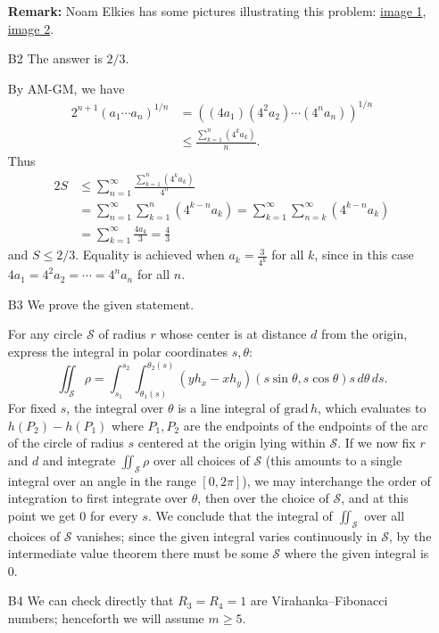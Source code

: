 \documentclass[amssymb,twocolumn,pra,10pt,aps]{revtex4-1}
\begin{document}
\begin{itemize}
\noindent
\textbf{Remark:} Noam Elkies has some pictures illustrating this problem:
\href{https://abel.math.harvard.edu/~elkies/putnam_b1a.pdf}{image 1},
\href{https://abel.math.harvard.edu/~elkies/putnam_b1.pdf}{image 2}.

\item[B2]
The answer is $2/3$. 

By AM-GM, we have
\begin{align*}
2^{n+1}(a_1\cdots a_n)^{1/n} &= \left((4a_1)(4^2a_2)\cdots (4^na_n)\right)^{1/n}\\
& \leq \frac{\sum_{k=1}^n (4^k a_k)}{n}.
\end{align*}
Thus
\begin{align*}
2S &\leq \sum_{n=1}^\infty \frac{\sum_{k=1}^n (4^k a_k)}{4^n} \\
&= \sum_{n=1}^\infty \sum_{k=1}^n (4^{k-n}a_k) = \sum_{k=1}^\infty \sum_{n=k}^\infty (4^{k-n}a_k) \\
&= \sum_{k=1}^\infty \frac{4a_k}{3}  = \frac{4}{3}
\end{align*}
and $S \leq 2/3$. Equality is achieved when $a_k=\frac{3}{4^k}$ for all $k$, since in this case $4a_1=4^2a_2=\cdots=4^na_n$ for all $n$.

\item[B3]
We prove the given statement.

For any circle $\mathcal{S}$ of radius $r$ whose center is at distance $d$ from the origin, express the integral in polar coordinates $s,\theta$:
\[
\iint_{\mathcal{S}} \rho = \int_{s_1}^{s_2} \int_{\theta_1(s)}^{\theta_2(s)} (yh_x - xh_y)(s \sin \theta, s \cos \theta) s\,d\theta\,ds.
\]
For fixed $s$, the integral over $\theta$ is a line integral of $\mathrm{grad} \, h$, which evaluates to $h(P_2) - h(P_1)$
where $P_1, P_2$ are the endpoints of the endpoints of the arc of the circle of radius $s$ centered at the origin lying within $\mathcal{S}$. If we now fix $r$ and $d$ and integrate $\iint_{\mathcal{S}} \rho$ over all choices of $\mathcal{S}$ (this amounts to a single integral over an angle in the range $[0, 2\pi]$), we may interchange the order of integration to first integrate over $\theta$,
then over the choice of $\mathcal{S}$, and at this point we get 0 for every $s$.
We conclude that the integral of $\iint_{\mathcal{S}}$ over all choices of $\mathcal{S}$ vanishes; since the given integral varies continuously in $\mathcal{S}$, by the intermediate value theorem there must be some $\mathcal{S}$  where the given integral is 0.

\item[B4]
We can check directly that $R_3=R_4=1$ are Virahanka--Fibonacci numbers; henceforth we will assume $m \geq 5$.


\end{itemize}
\end{document}
